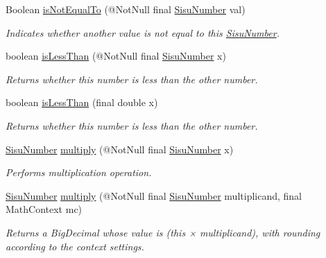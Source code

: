 \begin{DoxyCompactItemize}
Boolean \hyperlink{classcom_1_1aarrelaakso_1_1drawl_1_1_sisu_number_a883076b9744036998096851169a09ff4}{is\+Not\+Equal\+To} (@Not\+Null final \hyperlink{classcom_1_1aarrelaakso_1_1drawl_1_1_sisu_number}{Sisu\+Number} val)
\begin{DoxyCompactList}\small\item\em Indicates whether another value is not equal to this \hyperlink{classcom_1_1aarrelaakso_1_1drawl_1_1_sisu_number}{Sisu\+Number}. \end{DoxyCompactList}\item 
boolean \hyperlink{classcom_1_1aarrelaakso_1_1drawl_1_1_sisu_number_ada4f742aeff0f73e1257a8f7254714c9}{is\+Less\+Than} (@Not\+Null final \hyperlink{classcom_1_1aarrelaakso_1_1drawl_1_1_sisu_number}{Sisu\+Number} x)
\begin{DoxyCompactList}\small\item\em Returns whether this number is less than the other number. \end{DoxyCompactList}\item 
boolean \hyperlink{classcom_1_1aarrelaakso_1_1drawl_1_1_sisu_number_aa636492e0db290bbf9a0e58562346f2a}{is\+Less\+Than} (final double x)
\begin{DoxyCompactList}\small\item\em Returns whether this number is less than the other number. \end{DoxyCompactList}\item 
\hyperlink{classcom_1_1aarrelaakso_1_1drawl_1_1_sisu_number}{Sisu\+Number} \hyperlink{classcom_1_1aarrelaakso_1_1drawl_1_1_sisu_number_a0afac67b8a6e28baa04f762c1fd64e64}{multiply} (@Not\+Null final \hyperlink{classcom_1_1aarrelaakso_1_1drawl_1_1_sisu_number}{Sisu\+Number} x)
\begin{DoxyCompactList}\small\item\em Performs multiplication operation. \end{DoxyCompactList}\item 
\hyperlink{classcom_1_1aarrelaakso_1_1drawl_1_1_sisu_number}{Sisu\+Number} \hyperlink{classcom_1_1aarrelaakso_1_1drawl_1_1_sisu_number_ab6665d252e9ea749316cb123846ea476}{multiply} (@Not\+Null final \hyperlink{classcom_1_1aarrelaakso_1_1drawl_1_1_sisu_number}{Sisu\+Number} multiplicand, final Math\+Context mc)
\begin{DoxyCompactList}\small\item\em Returns a Big\+Decimal whose value is (this × multiplicand), with rounding according to the context settings. \end{DoxyCompactList}\item 

\end{DoxyCompactItemize}
